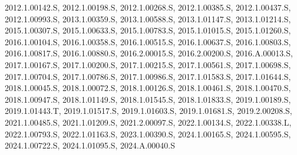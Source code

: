 \mbox{2012.1.00142.S}, \mbox{2012.1.00198.S}, \mbox{2012.1.00268.S}, \mbox{2012.1.00385.S}, \mbox{2012.1.00437.S}, \mbox{2012.1.00993.S}, \mbox{2013.1.00359.S}, \mbox{2013.1.00588.S}, \mbox{2013.1.01147.S}, \mbox{2013.1.01214.S}, \mbox{2015.1.00307.S}, \mbox{2015.1.00633.S}, \mbox{2015.1.00783.S}, \mbox{2015.1.01015.S}, \mbox{2015.1.01260.S}, \mbox{2016.1.00104.S}, \mbox{2016.1.00358.S}, \mbox{2016.1.00515.S}, \mbox{2016.1.00637.S}, \mbox{2016.1.00803.S}, \mbox{2016.1.00817.S}, \mbox{2016.1.00880.S}, \mbox{2016.2.00015.S}, \mbox{2016.2.00200.S}, \mbox{2016.A.00013.S}, \mbox{2017.1.00167.S}, \mbox{2017.1.00200.S}, \mbox{2017.1.00215.S}, \mbox{2017.1.00561.S}, \mbox{2017.1.00698.S}, \mbox{2017.1.00704.S}, \mbox{2017.1.00786.S}, \mbox{2017.1.00986.S}, \mbox{2017.1.01583.S}, \mbox{2017.1.01644.S}, \mbox{2018.1.00045.S}, \mbox{2018.1.00072.S}, \mbox{2018.1.00126.S}, \mbox{2018.1.00461.S}, \mbox{2018.1.00470.S}, \mbox{2018.1.00947.S}, \mbox{2018.1.01149.S}, \mbox{2018.1.01545.S}, \mbox{2018.1.01833.S}, \mbox{2019.1.00189.S}, \mbox{2019.1.01443.T}, \mbox{2019.1.01517.S}, \mbox{2019.1.01603.S}, \mbox{2019.1.01681.S}, \mbox{2019.2.00208.S}, \mbox{2021.1.00485.S}, \mbox{2021.1.01209.S}, \mbox{2021.2.00097.S}, \mbox{2022.1.00134.S}, \mbox{2022.1.00338.L}, \mbox{2022.1.00793.S}, \mbox{2022.1.01163.S}, \mbox{2023.1.00390.S}, \mbox{2024.1.00165.S}, \mbox{2024.1.00595.S}, \mbox{2024.1.00722.S}, \mbox{2024.1.01095.S}, \mbox{2024.A.00040.S}

